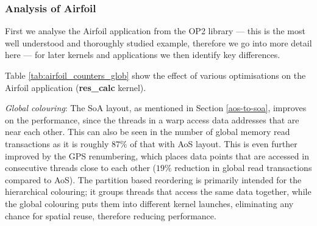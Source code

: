 \subsubsection{Analysis of Airfoil}

First we analyse the Airfoil application from the OP2 library --- this is the
most well understood and thoroughly studied example, therefore we go into more
detail here --- for later kernels and applications we then identify key
differences.

Table \ref{tab:airfoil_counters_glob} show the effect of various optimisations on the Airfoil application (\textbf{res\_calc}
kernel).

\emph{Global colouring}: The SoA layout, as mentioned in Section \ref{aos-to-soa}, improves on the
performance, since the threads in a warp access data addresses that are near
each other. This can also be seen in the number of global memory read
transactions as it is roughly $87\%$ of that with AoS layout. This is even
further improved by the GPS renumbering, which places data points that are accessed in
consecutive threads close to each other ($19\%$ reduction in global read
transactions compared to AoS). The partition based reordering is primarily intended for the hierarchical
colouring; it groups threads that access the same data together, while the
global colouring puts them into different kernel launches, eliminating any
chance for spatial reuse, therefore reducing performance.


